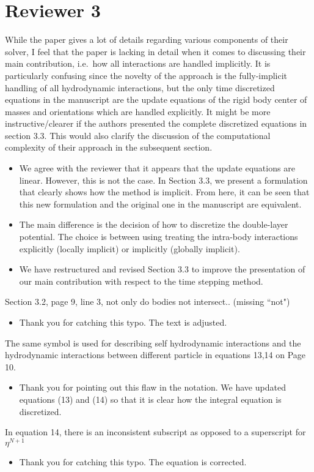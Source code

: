 \documentclass[11pt]{article}
\newcommand{\comment}[1]{{\color{blue} #1}}
\begin{document}
\section*{Reviewer 3}
\noindent
\comment{While the paper gives a lot of details regarding various
  components of their solver, I feel that the paper is lacking in detail
  when it comes to discussing their main contribution, i.e.~how all
  interactions are handled implicitly. It is particularly confusing
  since the novelty of the approach is the fully-implicit handling of
  all hydrodynamic interactions, but the only time discretized equations
  in the manuscript are the update equations of the rigid body center of
  masses and orientations which are handled explicitly. It might be more
  instructive/clearer if the authors presented the complete discretized
  equations in section 3.3. This would also clarify the discussion of
the computational complexity of their approach in the subsequent
section.}
\begin{itemize}
  \item We agree with the reviewer that it appears that the update
    equations are linear.  However, this is not the case.  In Section
    3.3, we present a formulation that clearly shows how the method is
    implicit.  From here, it can be seen that this new formulation and
    the original one in the manuscript are equivalent.

  \item The main difference is the decision of how to discretize the
    double-layer potential.  The choice is between using treating the
    intra-body interactions explicitly (locally implicit) or implicitly
    (globally implicit).

  \item We have restructured and revised Section 3.3 to improve the
    presentation of our main contribution with respect to the time
    stepping method.
\end{itemize}

\noindent
\comment{Section 3.2, page 9, line 3, not only do bodies not intersect..
(missing ``not")}
\begin{itemize}
  \item Thank you for catching this typo.  The text is adjusted.
\end{itemize}

\noindent
\comment{The same symbol is used for describing self hydrodynamic
interactions and the hydrodynamic interactions between different
particle in equations 13,14 on Page 10.}
\begin{itemize}
  \item Thank you for pointing out this flaw in the notation.  We have
    updated equations (13) and (14) so that it is clear how the integral
    equation is discretized.
\end{itemize}

\noindent
\comment{In equation 14, there is an inconsistent subscript as opposed
to a superscript for $\eta^{N+1}$}
\begin{itemize}
  \item Thank you for catching this typo.  The equation is corrected.
\end{itemize}
\end{document}
